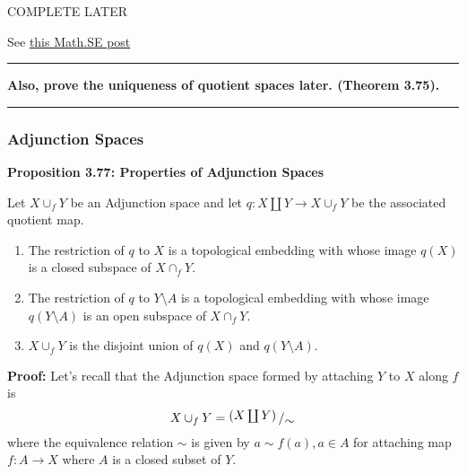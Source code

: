 \documentclass{article}
\newcommand{\bigslant}[2]{{\raisebox{.2em}{$#1$}\left/\raisebox{-.2em}{$#2$}\right.}}
\begin{document}
\vskip 0.5cm
COMPLETE LATER

See \href{https://math.stackexchange.com/questions/75413/uniqueness-of-the-quotient-topology#:~:text=(1)%20There%20can%20be%20at,is%20unique%20if%20it%20exists.}{this Math.SE post}

\vskip 0.5cm
\hrule
\vskip 0.5cm

\textbf{Also, prove the uniqueness of quotient spaces later. (Theorem 3.75).}

\vskip 0.5cm
\hrule
\vskip 0.5cm

\subsubsection{Adjunction Spaces}

\textbf{Proposition 3.77: Properties of Adjunction Spaces}

\vskip 0.5cm
Let $X \cup_f Y$ be an Adjunction space and let $q : X \coprod Y \rightarrow X \cup_f Y$ be the associated quotient map.

\begin{enumerate}
  \item The restriction of $q$ to $X$ is a topological embedding with whose image $q(X)$ is a closed subspace of $X \cap_f Y$.
  \item The restriction of $q$ to $Y \setminus A$ is a topological embedding with whose image $q(Y \setminus A)$ is an open subspace of $X \cap_f Y$.
  \item $X \cup_f Y$ is the disjoint union of $q(X)$ and $q(Y \setminus A)$.
\end{enumerate}

\vskip 0.5cm

\textbf{Proof:}
Let's recall that the Adjunction space formed by attaching $Y$ to $X$ along $f$ is 
\[ X \cup_f Y = \bigslant{\left(X \coprod Y\right)}{\sim} \]
where the equivalence relation $\sim$ is given by $a \sim f(a), a \in A$ for attaching map $f : A \rightarrow X$ where $A$ is a closed subset of $Y$.
\end{document}
